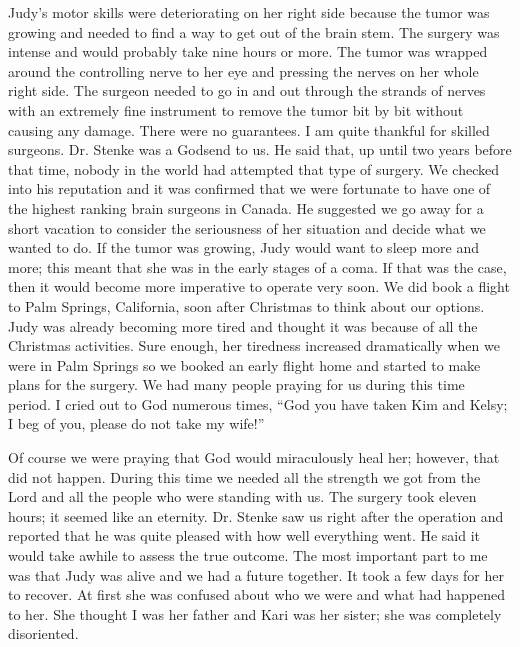 \documentclass[twoside, 12pt]{book}
\begin{document}
Judy’s motor skills were deteriorating on her right side because the tumor was growing and needed to find a way to get out of the brain stem. The surgery was intense and would probably take nine hours or more. The tumor was wrapped around the controlling nerve to her eye and pressing the nerves on her whole right side. The surgeon needed to go in and out through the strands of nerves with an extremely fine instrument to remove the tumor bit by bit without causing any damage. There were no guarantees. I am quite thankful for skilled surgeons. Dr. Stenke was a Godsend to us. He said that, up until two years before that time, nobody in the world had attempted that type of surgery. We checked into his reputation and it was confirmed that we were fortunate to have one of the highest ranking brain surgeons in Canada. He suggested we go away for a short vacation to consider the seriousness of her situation and decide what we wanted to do. If the tumor was growing, Judy would want to sleep more and more; this meant that she was in the early stages of a coma. If that was the case, then it would become more imperative to operate very soon. We did book a flight to Palm Springs, California, soon after Christmas to think about our options. Judy was already becoming more tired and thought it was because of all the Christmas activities. Sure enough, her tiredness increased dramatically when we were in Palm Springs so we booked an early flight home and started to make plans for the surgery. We had many people praying for us during this time period. I cried out to God numerous times, “God you have taken Kim and Kelsy; I beg of you, please do not take my wife!”

Of course we were praying that God would miraculously heal her; however, that did not happen. During this time we needed all the strength we got from the Lord and all the people who were standing with us. The surgery took eleven hours; it seemed like an eternity. Dr. Stenke saw us right after the operation and reported that he was quite pleased with how well everything went. He said it would take awhile to assess the true outcome. The most important part to me was that Judy was alive and we had a future together. It took a few days for her to recover. At first she was confused about who we were and what had happened to her. She thought I was her father and Kari was her sister; she was completely disoriented. 
\end{document}
